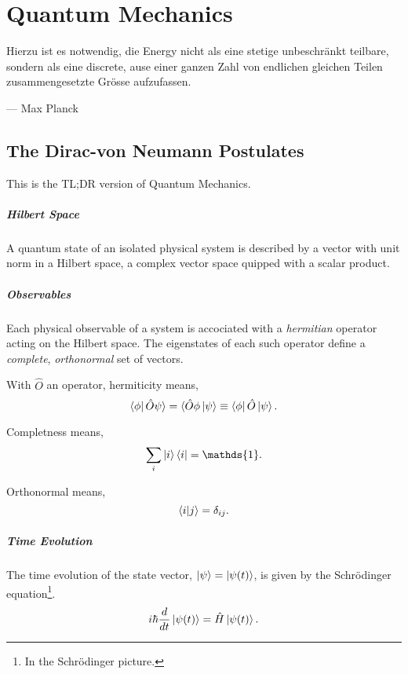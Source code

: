 \chapter{Quantum Mechanics}
    \epigraph{Hierzu ist es notwendig, die Energy nicht als eine stetige
    unbeschränkt teilbare, sondern als eine discrete, ause einer ganzen
    Zahl von endlichen gleichen Teilen zusammengesetzte Grösse 
    aufzufassen.}
    {--- Max Planck}


\section{The Dirac-von Neumann Postulates}

    This is the TL;DR version of Quantum Mechanics.

    \paragraph{Hilbert Space}
    A quantum state of an isolated physical system is described by a vector
    with unit norm in a Hilbert space, a complex vector space quipped with a
    scalar product. 

    \paragraph{Observables}
    Each physical observable of a system is accociated with a \emph{hermitian}
    operator acting on the Hilbert space. The eigenstates of each such
    operator define a \emph{complete}, \emph{orthonormal} set of vectors.

    With $\hat{O}$ an operator, hermiticity means,
    \begin{equation}
        \bra{\phi}\hat{O}\psi\rangle = \langle\hat{O}\phi\ket{\psi} \equiv \bra{\phi} \hat{O} \ket{\psi}.
    \end{equation}

    Completness means,
    \begin{equation}
        \sum_i \ket{i}\bra{i} = \mathds{1}.
    \end{equation}

    Orthonormal means,
    \begin{equation}
        \braket{i}{j} = \delta_{ij}.
    \end{equation}

    \paragraph{Time Evolution}
    The time evolution of the state vector, $\ket{\psi} = \ket{\psi (t)}$, is given by the Schrödinger
    equation\footnote{In the Schrödinger picture.}.
    \begin{equation}
        i\hbar \frac{d}{dt} \ket{\psi (t)} = \hat{H} \ket{\psi (t)}.
    \end{equation}

